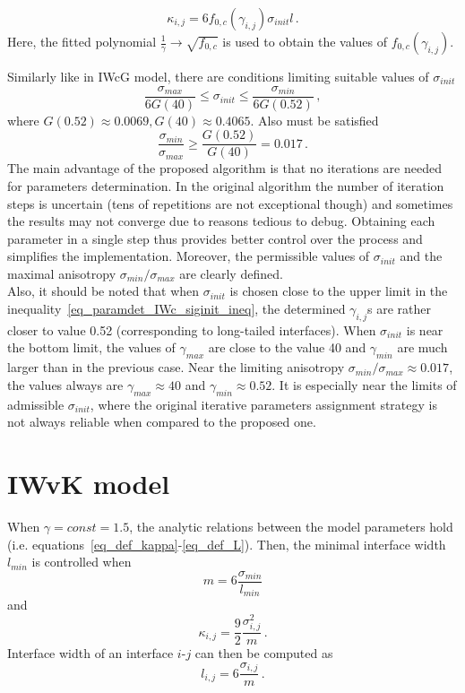 \begin{equation}
	\kappa_{i,j}=6f_{0,c}(\gamma_{i,j})\sigma_{init}l \,.
\end{equation}
Here, the fitted polynomial $\frac{1}{\gamma} \rightarrow \sqrt{f_{0,c}}$ is used to obtain the values of $f_{0,c}(\gamma_{i,j})$.

Similarly like in IWcG model, there are conditions limiting suitable values of $\sigma_{init}$
\begin{equation} \label{eq_paramdet_IWc_siginit_ineq}
	\frac{\sigma_{max}}{6G(40)} \leq \sigma_{init} \leq \frac{\sigma_{min}}{6G(0.52)} \,,
\end{equation}
where $G(0.52)\approx0.0069, G(40)\approx0.4065$. Also must be satisfied
\begin{equation}
	\frac{\sigma_{min}}{\sigma_{max}} \geq\frac{G(0.52)}{G(40)} = 0.017 \,. 
\end{equation}
The main advantage of the proposed algorithm is that no iterations are needed for parameters determination. In the original algorithm the number of iteration steps is uncertain (tens of repetitions are not exceptional though) and sometimes the results may not converge due to reasons tedious to debug. Obtaining each parameter in a single step thus provides better control over the process and simplifies the implementation. Moreover, the permissible values of $\sigma_{init}$ and the maximal anisotropy $\sigma_{min}/\sigma_{max}$ are clearly defined. \\
Also, it should be noted that when $\sigma_{init}$ is chosen close to the upper limit in the inequality~\ref{eq_paramdet_IWc_siginit_ineq}, the determined $\gamma_{i,j}$s are rather closer to value 0.52 (corresponding to long-tailed interfaces). When $\sigma_{init}$ is near the bottom limit, the values of $\gamma_{max}$ are close to the value 40 and $\gamma_{min}$ are much larger than in the previous case. Near the limiting anisotropy $\sigma_{min}/\sigma_{max}\approx0.017$, the values always are $\gamma_{max}\approx40$ and $\gamma_{min}\approx0.52$. It is especially near the limits of admissible $\sigma_{init}$, where the original iterative parameters assignment strategy is not always reliable when compared to the proposed one.

\section*{IWvK model}
When $\gamma=const=1.5$, the analytic relations between the model parameters hold (i.e. equations~\eqref{eq_def_kappa}-\eqref{eq_def_L}). Then, the minimal interface width $l_{min}$ is controlled when
\begin{equation}
	m = 6\frac{\sigma_{min}}{l_{min}}
\end{equation}
and
\begin{equation}
	\kappa_{i,j}=\frac{9}{2}\frac{\sigma_{i,j}^2}{m} \,.
\end{equation}
Interface width of an interface $i$-$j$ can then be computed as
\begin{equation}
	l_{i,j} = 6\frac{\sigma_{i,j}}{m} \,.
\end{equation}

\cleardoublepage

